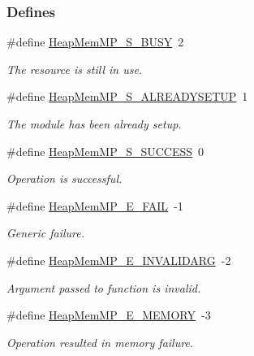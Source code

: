 \subsubsection*{Defines}
\begin{DoxyCompactItemize}
\item 
\#define \hyperlink{_heap_mem_m_p_8h_a992f6b5e02a835e5a5116fe2f968bdfe}{HeapMemMP\_\-S\_\-BUSY}~2
\begin{DoxyCompactList}\small\item\em The resource is still in use. \item\end{DoxyCompactList}\item 
\#define \hyperlink{_heap_mem_m_p_8h_a62e81fa297f6eb3a9cbc154170fbd608}{HeapMemMP\_\-S\_\-ALREADYSETUP}~1
\begin{DoxyCompactList}\small\item\em The module has been already setup. \item\end{DoxyCompactList}\item 
\#define \hyperlink{_heap_mem_m_p_8h_a220e8086edc8314cef6034e584b41c93}{HeapMemMP\_\-S\_\-SUCCESS}~0
\begin{DoxyCompactList}\small\item\em Operation is successful. \item\end{DoxyCompactList}\item 
\#define \hyperlink{_heap_mem_m_p_8h_a080d0886b807af624599a98987a4470b}{HeapMemMP\_\-E\_\-FAIL}~-\/1
\begin{DoxyCompactList}\small\item\em Generic failure. \item\end{DoxyCompactList}\item 
\#define \hyperlink{_heap_mem_m_p_8h_ac9be05da1907e0e8d229ddba4d68af96}{HeapMemMP\_\-E\_\-INVALIDARG}~-\/2
\begin{DoxyCompactList}\small\item\em Argument passed to function is invalid. \item\end{DoxyCompactList}\item 
\#define \hyperlink{_heap_mem_m_p_8h_ae16b106a9e2b1d56da7aa7310d6b4fc6}{HeapMemMP\_\-E\_\-MEMORY}~-\/3
\begin{DoxyCompactList}\small\item\em Operation resulted in memory failure. \item\end{DoxyCompactList}\item 

\end{DoxyCompactItemize}
